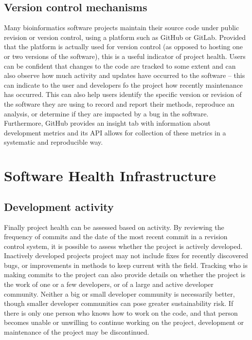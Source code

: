 \documentclass{article}
\begin{document}
\subsection{Version control mechanisms}
Many bioinformatics software projects maintain their source code under public revision or version control, using a platform such as GitHub or GitLab. Provided that the platform is actually used for version control (as opposed to hosting one or two versions of the software), this is a useful indicator of project health. Users can be confident that changes to the code are tracked to some extent and can also observe how much activity and updates have occurred to the software -- this can indicate to the user and developers fo the project how recently maintenance has occurred. This can also help users identify the specific version or revision of the software they are using to record and report their methods, reproduce an analysis, or determine if they are impacted by a bug in the software. Furthermore, GitHub provides an insight tab with information about development metrics and its API allows for collection of these metrics in a systematic and reproducible way. 

\section{Software Health Infrastructure}

\subsection{Development activity}
Finally project health can be assessed based on activity. By reviewing the frequency of commits and the date of the most recent commit in a revision control system, it is possible to assess whether the project is actively developed. Inactively developed projects project may not include fixes for recently discovered bugs, or improvements in methods to keep current with the field. Tracking who is making commits to the project can also provide details on whether the project is the work of one or a few developers, or of a large and active developer community. Neither a big or small developer community is necessarily better, though smaller developer communities can pose greater sustainability risk. If there is only one person who knows how to work on the code, and that person becomes unable or unwilling to continue working on the project, development or maintenance of the project may be discontinued. 
\end{document}
